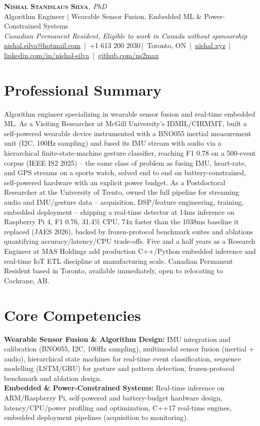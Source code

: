\documentclass[11pt]{article}
\makeatletter
\newcommand{\cvName}{Nishal Stanislaus Silva}
\newcommand{\cvEmail}{nishal.silva@hotmail.com}
\newcommand{\cvPhone}{+1 613 200 2030}
\newcommand{\cvCity}{Toronto, ON}
\newcommand{\cvSite}{https://nishal.xyz}
\newcommand{\cvLinkedIn}{https://www.linkedin.com/in/nishal-silva}
\newcommand{\cvGitHub}{https://github.com/ns2max}
\newcommand{\cvStatus}{Canadian Permanent Resident, Eligible to work in Canada without sponsorship}
\newcommand{\cvTagline}{Algorithm Engineer | Wearable Sensor Fusion, Embedded ML \& Power-Constrained Systems}
\makeatother
\begin{document}
\pagestyle{empty}
\begin{center}
    {\LARGE \scshape \textbf{\cvName}}{\large \textit{, PhD}}\\[1pt]
    {\small \cvTagline}\\[1pt]
    {\footnotesize\textit{\cvStatus}}\\[1pt]
    {\small
    \href{mailto:\cvEmail}{\cvEmail} \,|\, \cvPhone \,|\, \cvCity
    \,|\, \href{\cvSite}{nishal.xyz} \,|\, \href{\cvLinkedIn}{linkedin.com/in/nishal-silva}
    \,|\, \href{\cvGitHub}{github.com/ns2max}}
\end{center}

\section*{Professional Summary}
Algorithm engineer specializing in wearable sensor fusion and real-time embedded ML. As a Visiting Researcher at McGill University's IDMIL/CIRMMT, built a self-powered wearable device instrumented with a BNO055 inertial measurement unit (I2C, 100Hz sampling) and fused its IMU stream with audio via a hierarchical finite-state-machine gesture classifier, reaching F1 0.78 on a 500-event corpus (IEEE IS2 2025) -- the same class of problem as fusing IMU, heart-rate, and GPS streams on a sports watch, solved end to end on battery-constrained, self-powered hardware with an explicit power budget. As a Postdoctoral Researcher at the University of Trento, owned the full pipeline for streaming audio and IMU/gesture data -- acquisition, DSP/feature engineering, training, embedded deployment -- shipping a real-time detector at 14ms inference on Raspberry Pi 4, F1 0.76, 31.4\% CPU, 74x faster than the 1038ms baseline it replaced (JAES 2026), backed by frozen-protocol benchmark suites and ablations quantifying accuracy/latency/CPU trade-offs. Five and a half years as a Research Engineer at MAS Holdings add production C++/Python embedded inference and real-time IoT ETL discipline at manufacturing scale. Canadian Permanent Resident based in Toronto, available immediately, open to relocating to Cochrane, AB.

\section*{Core Competencies}
\textbf{Wearable Sensor Fusion \& Algorithm Design:} IMU integration and calibration (BNO055, I2C, 100Hz sampling), multimodal sensor fusion (inertial + audio), hierarchical state machines for real-time event classification, sequence modelling (LSTM/GRU) for gesture and pattern detection, frozen-protocol benchmark and ablation design. \\
\textbf{Embedded \& Power-Constrained Systems:} Real-time inference on ARM/Raspberry Pi, self-powered and battery-budget hardware design, latency/CPU/power profiling and optimization, C++17 real-time engines, embedded deployment pipelines (acquisition to monitoring).
\end{document}
